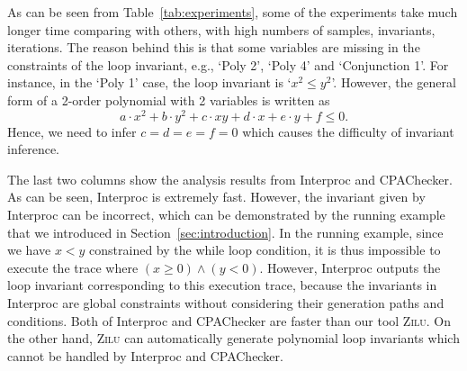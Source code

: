 As can be seen from Table~\ref{tab:experiments},
some of the experiments take much longer time comparing with others,
with high numbers of samples, invariants, iterations.
The reason behind this is
that some variables are missing in the constraints of the loop invariant,
e.g., `Poly 2', `Poly 4' and `Conjunction 1'.
For instance, in the `Poly 1' case, the loop invariant is `$x^2 \le y^2$'.
However, the general form of a 2-order polynomial with 2 variables
is written as
\[
    a \cdot x^2 + b \cdot y^2 + c \cdot x y + d \cdot x + e \cdot y + f \le 0.
\]
Hence, we need to infer $c = d = e = f = 0$
which causes the difficulty of invariant inference.

The last two columns show the analysis results from Interproc and CPAChecker.
As can be seen, Interproc is extremely fast.
However, the invariant given by Interproc can be incorrect,
which can be demonstrated by the running example
that we introduced in Section~\ref{sec:introduction}.
In the running example, since we have $x < y$ constrained by the while loop condition,
it is thus impossible to execute the trace where $(x \ge 0) \land (y < 0)$.
However, Interproc outputs the loop invariant corresponding to this execution trace,
because the invariants in Interproc are global constraints
without considering their generation paths and conditions.
Both of Interproc and CPAChecker are faster than our tool \textsc{Zilu}.
On the other hand, \textsc{Zilu} can automatically generate polynomial loop invariants
which cannot be handled by Interproc and CPAChecker.

